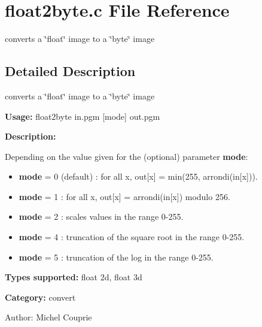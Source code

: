 \section{float2byte.c File Reference}
\label{float2byte_8c}
converts a \char`\"{}float\char`\"{} image to a \char`\"{}byte\char`\"{} image 



\subsection{Detailed Description}
converts a \char`\"{}float\char`\"{} image to a \char`\"{}byte\char`\"{} image 

{\bf Usage:} float2byte in.pgm [mode] out.pgm

{\bf Description:}

Depending on the value given for the (optional) parameter {\bf mode}: \begin{itemize}
\item {\bf mode} = 0 (default) : for all x, out[x] = min(255, arrondi(in[x])). \item {\bf mode} = 1 : for all x, out[x] = arrondi(in[x]) modulo 256. \item {\bf mode} = 2 : scales values in the range 0-255. \item {\bf mode} = 4 : truncation of the square root in the range 0-255. \item {\bf mode} = 5 : truncation of the log in the range 0-255.\end{itemize}
{\bf Types supported:} float 2d, float 3d

{\bf Category:} convert

\begin{Desc}
\item[Author:]Michel Couprie \end{Desc}
